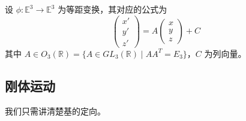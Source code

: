 \documentclass[lang=cn,10pt,thmcnt=section]{elegantbook}
\begin{document}
            \begin{proposition}
            设 $\phi: \mathbb{E}^3 \rightarrow \mathbb{E}^3$ 为等距变换，其对应的公式为
            \begin{equation}
            \begin{pmatrix}
            x' \\
            y' \\
            z'
            \end{pmatrix}
            = A
            \begin{pmatrix}
            x \\
            y \\
            z
            \end{pmatrix}
            + C
            \end{equation}
            其中 $A \in O_3(\mathbb{R}) = \{A \in GL_3(\mathbb{R}) \mid AA^T = E_3\}$，$C$ 为列向量。
            \end{proposition}
\subsection{刚体运动}
我们只需讲清楚基的定向。
\end{document}

